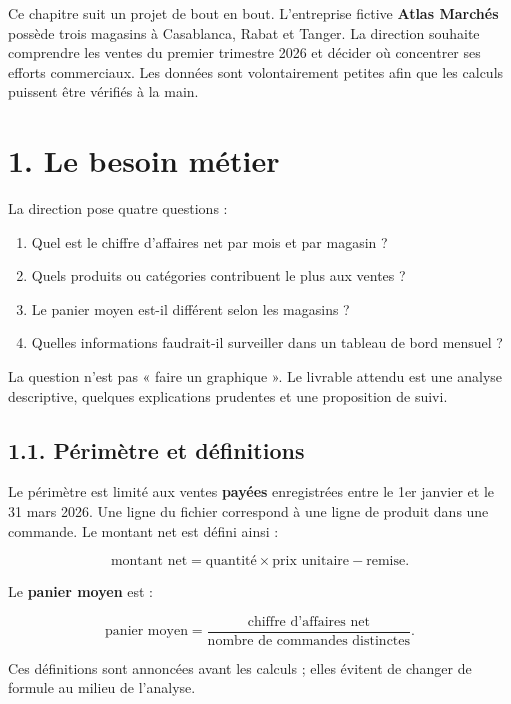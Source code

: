 \documentclass[
  french,
  letterpaper,
  open=any]{scrbook}
\providecommand{\tightlist}{%
  \setlength{\itemsep}{0pt}\setlength{\parskip}{0pt}}
\theoremstyle{definition}
\theoremstyle{definition}
\theoremstyle{remark}
\begin{document}
Ce chapitre suit un projet de bout en bout. L'entreprise fictive
\textbf{Atlas Marchés} possède trois magasins à Casablanca, Rabat et
Tanger. La direction souhaite comprendre les ventes du premier trimestre
2026 et décider où concentrer ses efforts commerciaux. Les données sont
volontairement petites afin que les calculs puissent être vérifiés à la
main.

\section{1. Le besoin métier}\label{le-besoin-muxe9tier}

La direction pose quatre questions :

\begin{enumerate}
\def\labelenumi{\arabic{enumi}.}
\tightlist
\item
  Quel est le chiffre d'affaires net par mois et par magasin ?
\item
  Quels produits ou catégories contribuent le plus aux ventes ?
\item
  Le panier moyen est-il différent selon les magasins ?
\item
  Quelles informations faudrait-il surveiller dans un tableau de bord
  mensuel ?
\end{enumerate}

La question n'est pas « faire un graphique ». Le livrable attendu est
une analyse descriptive, quelques explications prudentes et une
proposition de suivi.

\subsection{1.1. Périmètre et
définitions}\label{puxe9rimuxe8tre-et-duxe9finitions}

Le périmètre est limité aux ventes \textbf{payées} enregistrées entre le
1er janvier et le 31 mars 2026. Une ligne du fichier correspond à une
ligne de produit dans une commande. Le montant net est défini ainsi :

\[
\text{montant net}
=\text{quantité}\times\text{prix unitaire}-\text{remise}.
\]

Le \textbf{panier moyen} est :

\[
\text{panier moyen}
=\frac{\text{chiffre d'affaires net}}{\text{nombre de commandes distinctes}}.
\]

Ces définitions sont annoncées avant les calculs ; elles évitent de
changer de formule au milieu de l'analyse.
\end{document}
